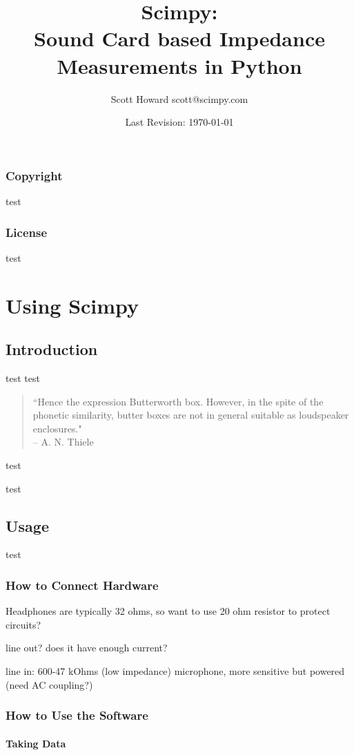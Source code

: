 \documentclass[10pt]{book}
\author{Scott Howard scott@scimpy.com}
\title{Scimpy:\\ \textbf{S}ound \textbf{C}ard based \textbf{I}mpedance \textbf{M}easurements in \textbf{Py}thon}
\date{Last Revision: \today}
\begin{document}
\frontmatter

\maketitle

\section*{Copyright}
test

\section*{License}
test


\tableofcontents

\mainmatter
\part{Using Scimpy}
\chapter{Introduction}
test test
\begin{quote}
``Hence the expression Butterworth box. However, in the spite of the phonetic similarity, butter boxes are not in general suitable as loudspeaker enclosures." \\-- A. N. Thiele
\end{quote}
test

test

\chapter{Usage}
test
\section{How to Connect Hardware}
Headphones are typically 32 ohms, so want to use 20 ohm resistor to protect circuits?

line out? does it have enough current?

line in: 600-47 kOhms (low impedance)
microphone, more sensitive but powered (need AC coupling?)
\section{How to Use the Software}
\subsection{Taking Data}
\end{document}
